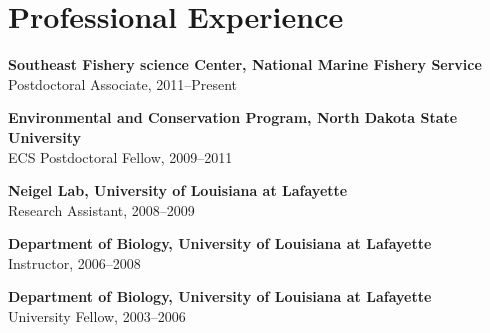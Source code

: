 \documentclass[letterpaper]{article}
\renewenvironment{itemize}{
  \begin{list}{}{
    \setlength{\leftmargin}{1em}
  }
}{
  \end{list}
}
\begin{document}
\section*{Professional Experience}
  \begin{itemize}
			\item \textbf{Southeast Fishery science Center, National Marine Fishery Service}\\
      Postdoctoral Associate, 2011--Present

			\item \textbf{Environmental and Conservation Program, North Dakota State University} \\
			ECS Postdoctoral Fellow, 2009--2011

			\item \textbf{Neigel Lab, University of Louisiana at Lafayette}  \\
       Research Assistant, 2008--2009 
      
			\item \textbf{Department of Biology, University of Louisiana at Lafayette} \\
       Instructor, 2006--2008 
      
			\item \textbf{Department of Biology, University of Louisiana at Lafayette} \\
      University Fellow, 2003--2006
      
	\end{itemize}

 
\end{document}
